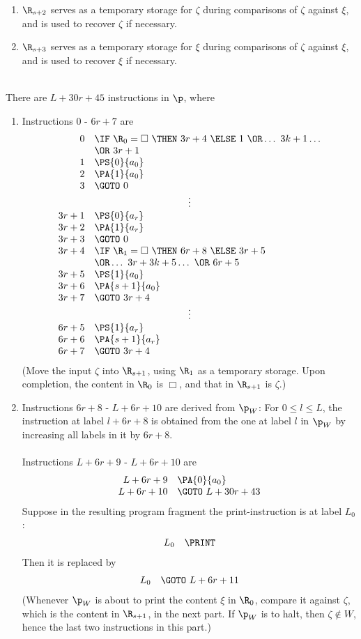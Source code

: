 \begin{enumerate}[1.]
\begin{enumerate}[1)]
\item $\R_{s + 2}$ serves as a temporary storage for $\zeta$ during comparisons of $\zeta$ against $\xi$, and is used to recover $\zeta$ if necessary.
\item $\R_{s + 3}$ serves as a temporary storage for $\xi$ during comparisons of $\zeta$ against $\xi$, and is used to recover $\xi$ if necessary.
\end{enumerate}
\ \\
There are $L + 30r + 45$ instructions in $\p$, where
\begin{enumerate}[(1)]
\item Instructions $0$ - $6r + 7$ are
\[
\begin{array}{rl}
0 & \IF \ \R_0 = \Box \ \THEN \ 3r + 4 \ \ELSE \ 1 \ \OR \ldots \ 3k + 1 \ldots \cr
\ & \OR \ 3r + 1 \cr
1 & \PS{0}{a_0} \cr
2 & \PA{1}{a_0} \cr
3 & \GOTO \ 0 \cr
\multicolumn{2}{c}{\vdots} \cr
3r + 1 & \PS{0}{a_r} \cr
3r + 2 & \PA{1}{a_r} \cr
3r + 3 & \GOTO \ 0 \cr
3r + 4 & \IF \ \R_1 = \Box \ \THEN \ 6r + 8 \ \ELSE \ 3r + 5 \cr
\ & \OR \ldots \ 3r + 3k + 5 \ldots \ \OR \ 6r + 5 \cr
3r + 5 & \PS{1}{a_0} \cr
3r + 6 & \PA{s + 1}{a_0} \cr
3r + 7 & \GOTO \ 3r + 4 \cr
\multicolumn{2}{c}{\vdots} \cr
6r + 5 & \PS{1}{a_r} \cr
6r + 6 & \PA{s + 1}{a_r} \cr
6r + 7 & \GOTO \ 3r + 4
\end{array}
\]
(Move the input $\zeta$ into $\R_{s + 1}$, using $\R_1$ as a temporary storage. Upon completion, the content in $\R_0$ is $\Box$, and that in $\R_{s + 1}$ is $\zeta$.)
\item Instructions $6r + 8$ - $L + 6r + 10$ are derived from $\p_W$: For $0 \leq l \leq L$, the instruction at label $l + 6r + 8$ is obtained from the one at label $l$ in $\p_W$ by increasing all labels in it by $6r + 8$.\\
\ \\
Instructions $L + 6r + 9$ - $L + 6r + 10$ are
\[
\begin{array}{rl}
L + 6r + 9 & \PA{0}{a_0} \cr
L + 6r + 10 & \GOTO \ L + 30r + 43
\end{array}
\]
Suppose in the resulting program fragment the print-instruction is at label $L_0$:
\[
\begin{array}{rl}
L_0 & \PRINT
\end{array}
\]
Then it is replaced by
\[
\begin{array}{rl}
L_0 & \GOTO \ L + 6r + 11
\end{array}
\]
(Whenever $\p_W$ is about to print the content $\xi$ in $\R_0$, compare it against $\zeta$, which is the content in $\R_{s + 1}$, in the next part. If $\p_W$ is to halt, then $\zeta \not \in W$, hence the last two instructions in this part.)

\end{enumerate}
\end{enumerate}
